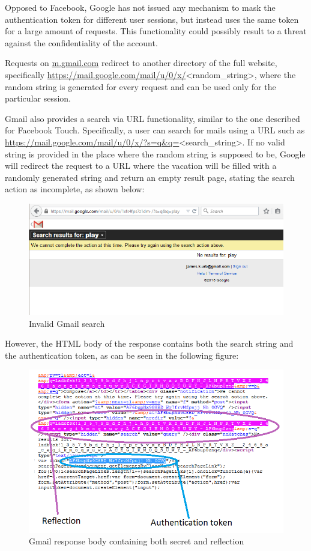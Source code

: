Opposed to Facebook, Google has not issued any mechanism to mask the
authentication token for different user sessions, but instead uses the same
token for a large amount of requests. This functionality could possibly result
to a threat against the confidentiality of the account.

Requests on \url{m.gmail.com} redirect to another directory of the full website,
specifically \url{https://mail.google.com/mail/u/0/x/}<random\_string>, where
the random string is generated for every request and can be used only for the
particular session.

Gmail also provides a search via URL functionality, similar to the one described
for Facebook Touch. Specifically, a user can search for mails using a URL such
as \url{https://mail.google.com/mail/u/0/x/?s=q&q=}<search\_string>. If no
valid string is provided in the place where the random string is supposed
to be, Google will redirect the request to a URL where the vacation will be
filled with a randomly generated string and return an empty result page,
stating the search action as incomplete, as shown below:

\begin{figure}[h] \caption{Invalid Gmail search} \centering
\includegraphics[width=1\textwidth]{diagrams/gmail_search.png}\end{figure}

However, the HTML body of the response contains both the search string and the
authentication token, as can be seen in the following figure:

\begin{figure}[h] \caption{Gmail response body containing both secret and
reflection} \centering
\includegraphics[width=1\textwidth]{diagrams/gmail_response.png}\end{figure}

